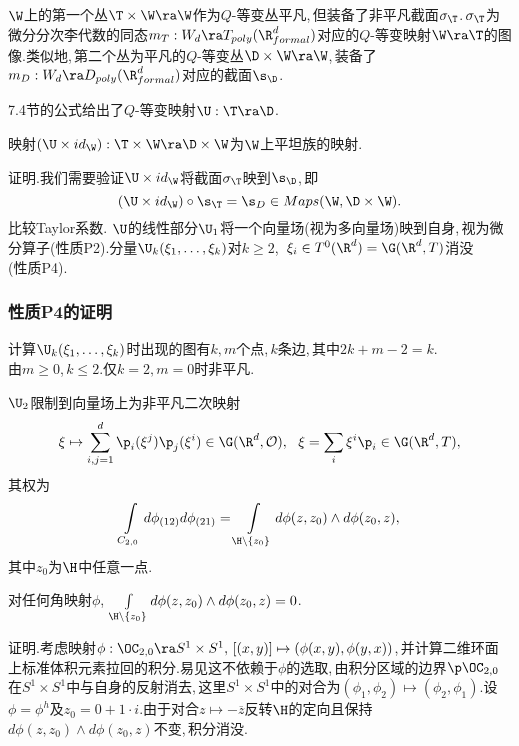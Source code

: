 $\W$上的第一个丛$\T\times\W\ra \W$作为$Q$-等变丛平凡,\,但装备了非平凡截面${\sigma}_\T$.\,${\sigma}_\T$为微分分次李代数的同态$m_T:W_d\ra T_{poly}(\R^d_{formal})$对应的$Q$-等变映射$\W\ra \T$的图像.类似地,\,第二个丛为平凡的$Q$-等变丛$\D\times\W\ra \W$,\,装备了\\$m_D:W_d\ra D_{poly}(\R^d_{formal})$对应的截面$\s_\D$.

7.4节的公式给出了$Q$-等变映射$\U:\T\ra \D$.

\begin{lem}
映射$(\U\times id_{\W}):\T\times\W\ra
             \D \times \W$为$\W$上平坦族的映射.
\end{lem}
证明.我们需要验证$\U\times id_{\W}$将截面${\sigma}_\T$映到$\s_\D$,\,即
$$(\U\times id_{\W})\circ \s_\T=
              \s_D\in Maps(\W,\D\times \W).$$ 
比较Taylor系数.\,\,$\U$的线性部分$\U_1$将一个向量场(视为多向量场)映到自身,\,视为微分算子(性质P2).分量$\U_k(\xi_1,\dots
                 , \xi_k)$对$k\ge 2$,\,\,\,$\xi_i\in T^0(\R^d)=
                 \G(\R^d,T)$消没\\(性质P4).

\subsubsection{性质P4的证明}
计算$\U_k(\xi_1,\dots  , \xi_k)$时出现的图有$k,m$个点,\,$k$条边,\,其中$2k+m-2=k$.\\由$m\ge 0$,\,$k\leq 2$.仅$k=2,m=0$时非平凡.

$\U_2$限制到向量场上为非平凡二次映射
$$\xi\mapsto \sum_{i,j=1}^d   \p_i(\xi^j)\p_j(\xi^i)\in\G(\R^d,  {\cal O}),\,\,\,\, \xi=\sum_i \xi^i\p_i\in\G(\R^d,T),$$
其权为
$$\int\limits_{C_{2,0}} d\phi_{(12)} d\phi_{(21)}=\int
                \limits_{\H\setminus
                 \{z_0\}} d\phi(z,z_0)\wedge d\phi(z_0,z),$$
其中$z_0$为$\H$中任意一点.

\begin{lem}
对任何角映射$\phi$,\,\,$\int\limits_{\H\setminus
                 \{z_0\}} d\phi(z,z_0)\wedge d\phi(z_0,z)=0$.
\end{lem}
证明.考虑映射$\phi:\OC_{2,0}\ra S^1\times S^1,\,[(x,y)]\mapsto (\phi(x,y),\phi(y,x))$,\,并计算二维环面上标准体积元素拉回的积分.易见这不依赖于$\phi$的选取,\,由积分区域的边界$\p \OC_{2,0}$在$S^1\times S^1$中与自身的反射消去,\,这里$S^1\times S^1$中的对合为$(\phi_1,\phi_2)\mapsto (\phi_2,\phi_1)$.设$\phi=\phi^h$及$z_0=0+1\cdot i$.由于对合$z\mapsto -{\overline z}$反转$\H$的定向且保持$d\phi(z,z_0)\wedge d\phi(z_0,z)$不变,\,积分消没.\,



